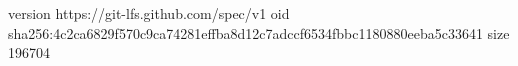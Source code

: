 version https://git-lfs.github.com/spec/v1
oid sha256:4c2ca6829f570c9ca74281effba8d12c7adccf6534fbbc1180880eeba5c33641
size 196704
